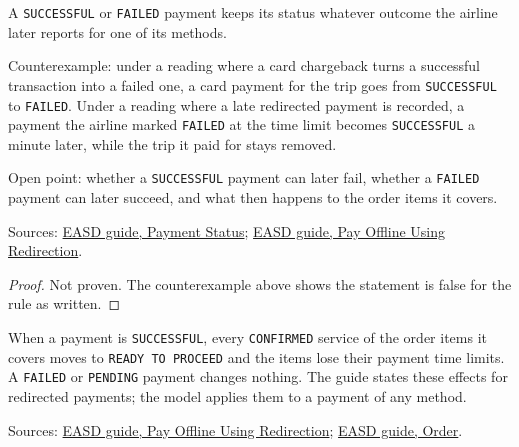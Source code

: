 \begin{theorem}
  \label{thm:payment-settled-final}
  A \texttt{SUCCESSFUL} or \texttt{FAILED} payment keeps its status whatever
  outcome the airline later reports for one of its methods.

  Counterexample: under a reading where a card chargeback turns a successful
  transaction into a failed one, a card payment for the trip goes from
  \texttt{SUCCESSFUL} to \texttt{FAILED}.  Under a reading where a late
  redirected payment is recorded, a payment the airline marked
  \texttt{FAILED} at the time limit becomes \texttt{SUCCESSFUL} a minute
  later, while the trip it paid for stays removed.

  Open point: whether a \texttt{SUCCESSFUL} payment can later fail, whether
  a \texttt{FAILED} payment can later succeed, and what then happens to the
  order items it covers.

  Sources: \href{https://standards.atlassian.net/wiki/spaces/EASD/pages/574423154/Payment+Status}{EASD guide, Payment Status};
  \href{https://standards.atlassian.net/wiki/spaces/EASD/pages/574455927/Pay+Offline+Using+Redirection}{EASD guide, Pay Offline Using Redirection}.
\end{theorem}
\begin{proof}
  Not proven.  The counterexample above shows the statement is false for the
  rule as written.
\end{proof}

\begin{definition}
  \label{def:payment-apply-outcome}
  When a payment is \texttt{SUCCESSFUL}, every \texttt{CONFIRMED} service of
  the order items it covers moves to \texttt{READY TO PROCEED} and the items
  lose their payment time limits.  A \texttt{FAILED} or \texttt{PENDING}
  payment changes nothing.  The guide states these effects for redirected
  payments; the model applies them to a payment of any method.

  Sources: \href{https://standards.atlassian.net/wiki/spaces/EASD/pages/574455927/Pay+Offline+Using+Redirection}{EASD guide, Pay Offline Using Redirection};
  \href{https://standards.atlassian.net/wiki/spaces/EASD/pages/574849062/Order}{EASD guide, Order}.
\end{definition}

